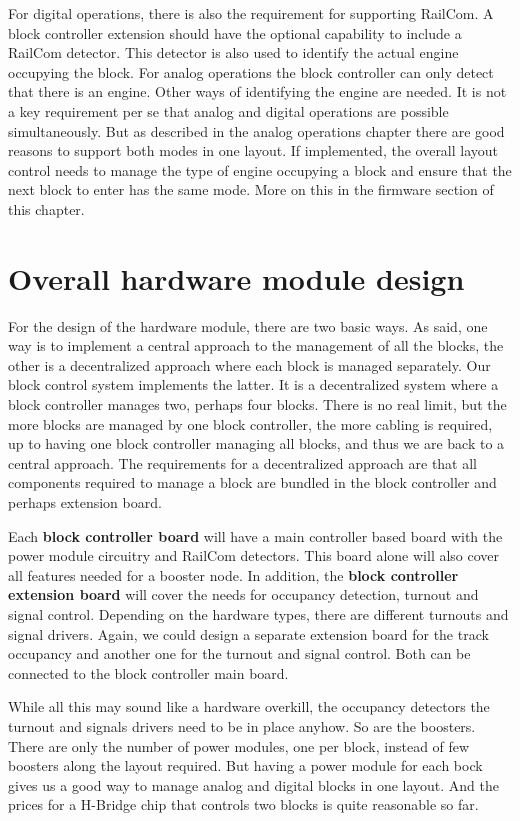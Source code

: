 For digital operations, there is also the requirement for supporting RailCom. A block controller extension should have the optional capability to include a RailCom detector. This detector is also used to identify the actual engine occupying the block. For analog operations the block controller can only detect that there is an engine. Other ways of identifying the engine are needed. It is not a key requirement per se that analog and digital operations are possible simultaneously. But as described in the analog operations chapter there are good reasons to support both modes in one layout. If implemented, the overall layout control needs to manage the type of engine occupying a block and ensure that the next block to enter has the same mode. More on this in the firmware section of this chapter.

\section{Overall hardware module design}

For the design of the hardware module, there are two basic ways. As said, one way is to implement a central approach to the management of all the blocks, the other is a decentralized approach where each block is managed separately. Our block control system implements the latter. It is a decentralized system where a block controller manages two, perhaps four blocks. There is no real limit, but the more blocks are managed by one block controller, the more cabling is required, up to having one block controller managing all blocks, and thus we are back to a central approach. The requirements for a decentralized approach are that all components required to manage a block are bundled in the block controller and perhaps extension board.

Each \textbf{block controller board} will have a main controller based board with the power module circuitry and RailCom detectors. This board alone will also cover all features needed for a booster node. In addition, the\textbf{ block controller extension board} will cover the needs for occupancy detection, turnout and signal control. Depending on the hardware types, there are different turnouts and signal drivers. Again, we could design a separate extension board for the track occupancy and another one for the turnout and signal control. Both can be connected to the block controller main board.

While all this may sound like a hardware overkill, the occupancy detectors the turnout and signals drivers need to be in place anyhow. So are the boosters. There are only the number of power modules, one per block, instead of few boosters along the layout required. But having a power module for each bock gives us a good way to manage analog and digital blocks in one layout. And the prices for a H-Bridge chip that controls two blocks is quite reasonable so far.

